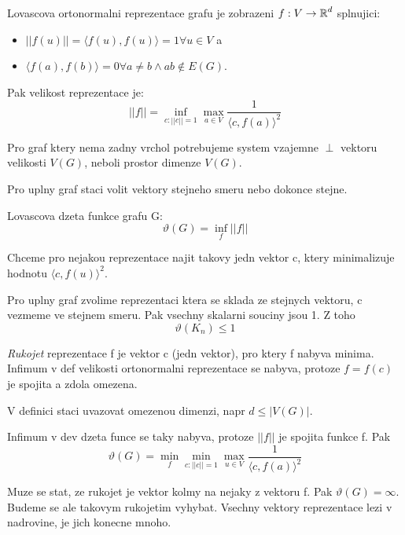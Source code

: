 \begin{definition}
	Lovascova ortonormalni reprezentace grafu je zobrazeni $f:V \to \operatorname{\mathbb{R}}^d$ splnujici:
	\begin{itemize}
		\item $|| f(u) || = \langle f(u), f(u) \rangle = 1 \forall u \in V$ a
		\item $\langle f(a), f(b) \rangle = 0 \forall a \ne b \land ab \notin E(G)$.
	\end{itemize}

	Pak velikost reprezentace je:
	\[ || f || = \inf_{c: ||c|| = 1} \max_{a \in V} \frac{1}{\langle c, f(a) \rangle^2} \]
\end{definition}

\begin{example}
	Pro graf ktery nema zadny vrchol potrebujeme system vzajemne $\perp$ vektoru velikosti $V(G)$, neboli prostor dimenze $V(G)$.

	Pro uplny graf staci volit vektory stejneho smeru nebo dokonce stejne.
\end{example}

\begin{definition}
	Lovascova dzeta funkce grafu G:
	\[ \vartheta(G) = \inf_f || f || \]

	Chceme pro nejakou reprezentace najit takovy jedn vektor c, ktery minimalizuje hodnotu $\langle c, f(u) \rangle^2$.
\end{definition}

\begin{example}
	Pro uplny graf zvolime reprezentaci ktera se sklada ze stejnych vektoru, c vezmeme ve stejnem smeru.
	Pak vsechny skalarni souciny jsou 1. Z toho
	\[ \vartheta(K_n) \leq 1 \]
\end{example}

\begin{definition}
	\emph{Rukojet} reprezentace f je vektor c (jedn vektor), pro ktery f nabyva minima.
	Infimum v def velikosti ortonormalni reprezentace se nabyva, protoze $f = f(c)$ je spojita a zdola omezena.

	V definici staci uvazovat omezenou dimenzi, napr $d \leq |V(G)|$.

	Infimum v dev dzeta funce se taky nabyva, protoze $||f||$ je spojita funkce f. Pak
	\[ \vartheta(G) = \min_f \min_{c: ||c|| = 1} \max_{u \in V} \frac{1}{\langle c, f(a) \rangle^2} \]
\end{definition}
\begin{agreement}
	Muze se stat, ze rukojet je vektor kolmy na nejaky z vektoru f. Pak $\vartheta(G) = \infty$.
	Budeme se ale takovym rukojetim vyhybat. Vsechny vektory reprezentace lezi v nadrovine, je jich konecne mnoho.
\end{agreement}

